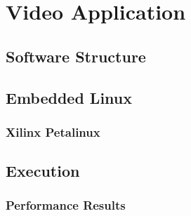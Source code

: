 
\chapter{Video Application}

\section{Software Structure}

\section{Embedded Linux}

\subsection{Xilinx Petalinux}

\section{Execution}

\subsection{Performance Results}